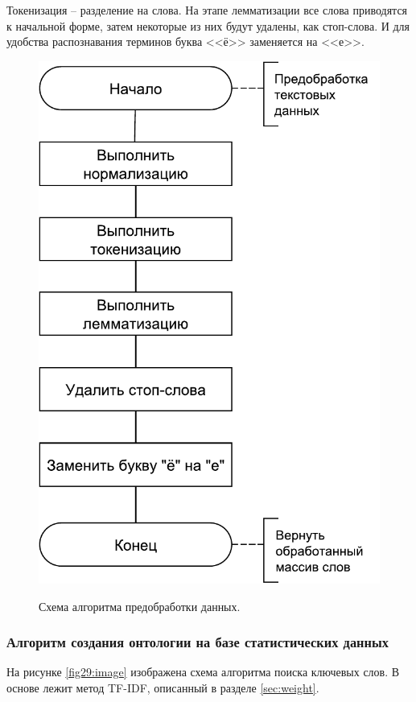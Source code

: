 Токенизация -- разделение на слова. На этапе лемматизации все слова приводятся к начальной форме, затем некоторые из них будут удалены, как стоп-слова. И для удобства распознавания терминов буква <<ё>> заменяется на <<е>>. 
\begin{figure}[h]
	\begin{center}
		{\includegraphics[scale = 0.6]{img/schemes/pdf/preprocess.pdf}}
		\caption{Схема алгоритма предобработки данных.}
		\label{fig28:image}
	\end{center}
\end{figure}

\subsubsection{Алгоритм создания онтологии на базе статистических данных}
На рисунке \ref{fig29:image} изображена схема алгоритма поиска ключевых слов. В основе лежит метод TF-IDF, описанный в разделе \ref{sec:weight}. 


